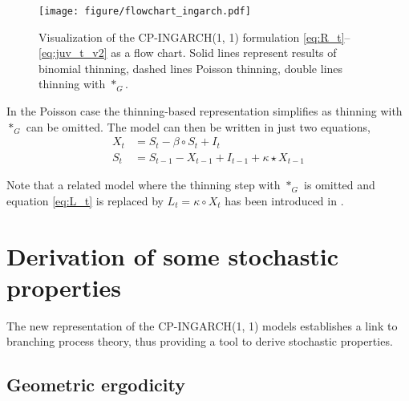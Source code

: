 \documentclass{article}
\begin{document}
\begin{figure}[h!]
\center
\texttt{[image: figure/flowchart\_ingarch.pdf]}
\caption{Visualization of the CP-INGARCH(1, 1) formulation \eqref{eq:R_t}--\eqref{eq:juv_t_v2} as a flow chart. Solid lines represent results of binomial thinning, dashed lines Poisson thinning, double lines thinning with $*_G$.}
\label{fig:ingarch_flowchart}
\end{figure}


In the Poisson case the thinning-based representation simplifies as thinning with $*_G$ can be omitted. The model can then be written in just two equations,
\begin{align*}
X_t & = S_t - \beta \circ S_t + I_t\\
S_t & = S_{t - 1} - X_{t - 1} + I_{t - 1} + \kappa \star X_{t - 1}
\end{align*}

Note that a related model where the thinning step with $*_G$ is omitted and equation \eqref{eq:L_t} is replaced by
$L_t = \kappa \circ X_t$ has been introduced in \cite{Bracher2019}.

\section{Derivation of some stochastic properties}

The new representation of the CP-INGARCH(1, 1) models establishes a link to branching process theory, thus providing a tool to derive stochastic properties.

\subsection{Geometric ergodicity}
\end{document}
